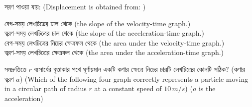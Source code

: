 \documentclass[addpoints]{exam}
\begin{document}
\begin{questions}
\question  সরণ পাওয়া যায়: (Displacement is obtained from: )

\begin{oneparchoices}
\choice বেগ-সময় লেখচিত্রের ঢাল থেকে (the slope of the velocity-time graph.)\\
\hspace*{-.3cm}\choice ত্বরণ-সময় লেখচিত্রের ঢাল থেকে (the slope of the acceleration-time graph.)\\
\hspace*{-.3cm}\choice বেগ-সময় লেখচিত্রের নিচের ক্ষেত্রফল থেকে (the area under the velocity-time graph.)\\
\hspace*{-.3cm}\choice ত্বরণ-সময় লেখচিত্রের ক্ষেত্রফল থেকে (the area under the acceleration-time graph.)

\end{oneparchoices}

\question সমদ্রুতিতে $ r $ ব্যসার্ধের বৃত্তাকার পথে ঘূর্ণায়মান একটি কণার ক্ষেত্রে নিচের চারটি লেখচিত্রের কোনটি সঠিক? (কণার ত্বরণ $ a $) (Which of the following four graph correctly represents a particle moving in a circular path of radius $ r $ at a constant speed of $ 10\,m/s $) ($ a $ is the acceleration)

\begin{oneparchoices}
 \choice{}
 \choice {}
\choice{}
 \choice {}
\end{oneparchoices}



\end{questions}
\end{document}
